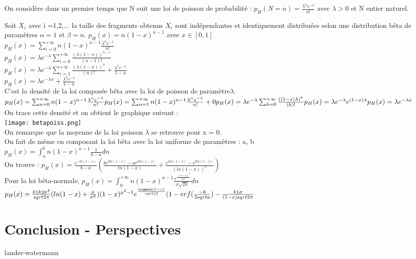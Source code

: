 \documentclass[12pt,a4paper]{article} %
\begin{document}
On considère dans un premier temps que N suit une loi de poisson de probabilité : 
$p_{H}(N=n) =\frac{\lambda^{n}e^{-\lambda}}{n!}$
avec $\lambda >0 $ et N entier naturel.

Soit $X_i$ avec i =1,2,... la taille des fragments obtenus 
$X_i$ sont indépendantes et identiquement distribuées selon une distribution bêta de paramètres $\alpha = 1$ et $\beta=n$.
$p_{H}(x) =n(1-x)^{n-1}$ avec $x\in[0,1]$\\
$p_{H}(x) = \sum_{i=0}^{+\infty}n(1-x)^{n-1}\frac{\lambda^{n}e^{-\lambda}}{n!}$\\
$p_{H}(x)= \lambda e^{-\lambda}\sum_{i=0}^{+\infty}\frac{(\lambda (1-x))^{n-1}}{(n-1)!}$ \\
$p_{H}(x)= \lambda e^{-\lambda}\sum_{i=1}^{+\infty}\frac{(\lambda (1-x))^{n}}{(n)!} + \frac{\lambda^{2}e^{-\lambda}}{1-x}$ \\
$p_{H}(x)= \lambda e^{-\lambda x} + \frac{\lambda^{2}e^{-\lambda}}{1-x}$ \\
C'est la densité de la loi composée bêta avec la loi de poisson de paramètre$\lambda$. \\
$p_{H}(x) = \sum_{n=0}^{+\infty}n(1-x)^{n-1}\frac{\lambda^{n}e^{-\lambda}}{n!} \\ p_{H}(x) = \sum_{n=1}^{+\infty}n(1-x)^{n-1}\frac{\lambda^{n}e^{-\lambda}}{n!} + 0 \\
p_{H}(x) = \lambda e^{-\lambda}\sum_{k=0}^{+\infty}\frac{((1-x)\lambda)^{k}}{(k)!} \\
p_{H}(x) = \lambda e^{-\lambda}e^{(1-x)\lambda} \\
p_{H}(x) = \lambda e^{-\lambda x}
$ \\
On trace cette densité et on obtient le graphique suivant : \\
\texttt{[image: betapoiss.png]}\\
On remarque que la moyenne de la loi poisson $\lambda$ se retrouve pour x = 0. 
\\On fait de même en composant la loi bêta avec la loi uniforme de paramètres : a, b \\
$p_{H}(x) = \int_{a}^{b}n(1-x)^{n-1}\frac{1}{b-a}dn$\\
On trouve : $ p_{H}(x)=\frac{e^{-ln(1-x)}}{b-a}(\frac{be^{bln(1-x)}-ae^{aln(1-x)}}{ln(1-x)}+ \frac{e^{aln(1-x)}-e^{bln(1-x)}}{(ln(1-x))^2})$\\

Pour la loi bêta-normale, $p_{H}(x) = \int_{0}^{+\infty}n(1-x)^{n-1}\frac{e^{\frac{-(n-\mu)^2}{2\sigma^2}}}{\sigma\sqrt{2\pi}}dn$
$p_{H}(x)=\frac{k1k2\sigma^2}{sqrt{2\pi}}(ln(1-x)+\frac{\mu}{\sigma^2})(1-x)^{\mu^2 - 1}e^{\frac{\sigmaln(1-x)}{sqrt(2}}(1-erf(\frac{-b}{2sqrt{a}})-\frac{k1\sigma}{(1-x)sqrt{2\pi}}$
\section{Conclusion - Perspectives} 
lander-watermann
\newpage
\listoffigures
\newpage
\newpage

\nocite{*}

\end{document}
